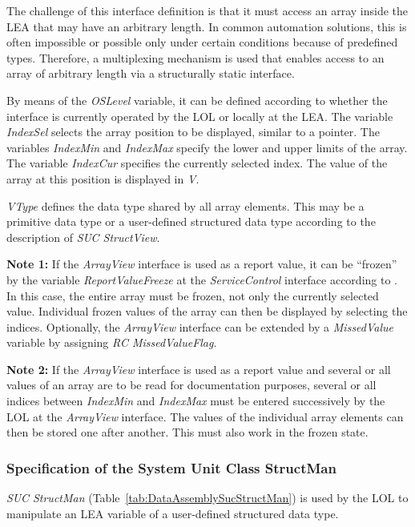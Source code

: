 The challenge of this interface definition is that it must access an array inside the LEA that may have an arbitrary length. In common automation solutions, this is often impossible or possible only under certain conditions because of predefined types. Therefore, a multiplexing mechanism is used that enables access to an array of arbitrary length via a structurally static interface. 

By means of the \emph{OSLevel} variable, it can be defined according to \cite{PNO.2025.Part3} whether the interface is currently operated by the LOL or locally at the LEA. The variable \emph{IndexSel} selects the array position to be displayed, similar to a pointer. The variables \emph{IndexMin} and \emph{IndexMax} specify the lower and upper limits of the array. The variable \emph{IndexCur} specifies the currently selected index. The value of the array at this position is displayed in \emph{V}. 

\emph{VType} defines the data type shared by all array elements. This may be a primitive data type or a user-defined structured data type according to the description of \emph{SUC StructView}.

\textbf{Note 1:} If the \emph{ArrayView} interface is used as a report value, it can be \enquote{frozen} by the variable \emph{ReportValueFreeze} at the \emph{ServiceControl} interface according to \cite{PNO.2025.Part4}. In this case, the entire array must be frozen, not only the currently selected value. Individual frozen values of the array can then be displayed by selecting the indices. Optionally, the \emph{ArrayView} interface can be extended by a \emph{MissedValue} variable by assigning \emph{RC MissedValueFlag}. 

\textbf{Note 2:} If the \emph{ArrayView} interface is used as a report value and several or all values of an array are to be read for documentation purposes, several or all indices between \emph{IndexMin} and \emph{IndexMax} must be entered successively by the LOL at the \emph{ArrayView} interface. The values of the individual array elements can then be stored one after another. This must also work in the frozen state.

\subsubsection{Specification of the System Unit Class StructMan}

\emph{SUC StructMan} (Table~\ref{tab:DataAssemblySucStructMan}) is used by the LOL to manipulate an LEA variable of a user-defined structured data type.

